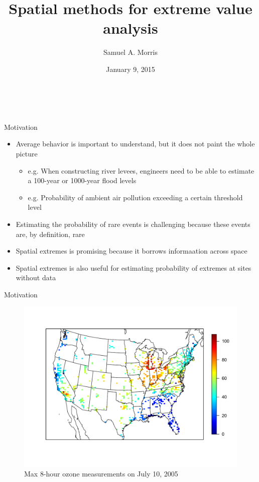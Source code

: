 \documentclass{beamer}
\title[Spatial methods for EVA] %
{
  Spatial methods for extreme value analysis
}
\author[S. Morris]{Samuel A. Morris}
\institute[]{North Carolina State University}
\date[]{January 9, 2015}
\begin{document}
\begin{frame}\frametitle{\ }
\begin{center}
  \maketitle
\end{center}
\end{frame}

\begin{frame}{Motivation}
  \begin{itemize} \setlength{\itemsep}{1em}
    \item Average behavior is important to understand, but it does not paint the whole picture
    \begin{itemize}
      \item e.g. When constructing river levees, engineers need to be able to estimate a 100-year or 1000-year flood levels
      \item e.g. Probability of ambient air pollution exceeding a certain threshold level
    \end{itemize}
    \item Estimating the probability of rare events is challenging because these events are, by definition, rare
    \item Spatial extremes is promising because it borrows informaation across space
    \item Spatial extremes is also useful for estimating probability of extremes at sites without data
  \end{itemize}
\end{frame}

\begin{frame}{Motivation}
  \centering
  \begin{figure}
    \includegraphics[width=\linewidth, trim=0 1in 0 1in ]{./plots/pot/ozone-10jul-us.pdf}
    \caption{Max 8-hour ozone measurements on July 10, 2005}
   \end{figure}
\end{frame}
\end{document}

